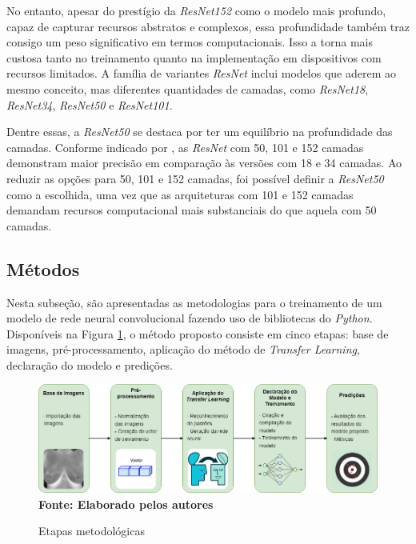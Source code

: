 No entanto, apesar do prestígio da \textit{ResNet152} como o modelo mais profundo, capaz de capturar recursos abstratos e complexos, essa profundidade também traz consigo um peso significativo em termos computacionais. Isso a torna mais custosa tanto no treinamento quanto na implementação em dispositivos com recursos limitados. A família de variantes \textit{ResNet} inclui modelos que aderem ao mesmo conceito, mas diferentes quantidades de camadas, como \textit{ResNet18}, \textit{ResNet34}, \textit{ResNet50} e \textit{ResNet101}. 

Dentre essas, a \textit{ResNet50} se destaca por ter um equilíbrio na profundidade das camadas. Conforme indicado por , as \textit{ResNet} com 50, 101 e 152 camadas demonstram maior precisão em comparação às versões com 18 e 34 camadas. Ao reduzir as opções para 50, 101 e 152 camadas, foi possível definir a \textit{ResNet50} como a escolhida, uma vez que as arquiteturas com 101 e 152 camadas demandam recursos computacional mais substanciais do que aquela com 50 camadas.





\subsection{\esp Métodos} \label{metodos}

Nesta subseção, são apresentadas as metodologias para o treinamento de um modelo de rede neural convolucional fazendo uso de bibliotecas do \textit{Python}. Disponíveis na Figura \ref{fig:diagrama}, o método proposto consiste em cinco etapas: base de imagens, pré-processamento, aplicação do método de \textit{Transfer Learning}, declaração do modelo e predições.

\begin{figure}[ht]
 	\centering	
 	\caption[\hspace{0.1cm}Grade Computacional.]{Etapas metodológicas}
 	\vspace{-0.2cm}
 	\includegraphics[width=1\textwidth]{figuras/tcc_diagrama.drawio.png}
    \captionsetup{justification=centering}
  \vspace{-0.2cm}
     \\\textbf{\footnotesize Fonte: Elaborado pelos autores}
	\label{fig:diagrama}
\end{figure}



